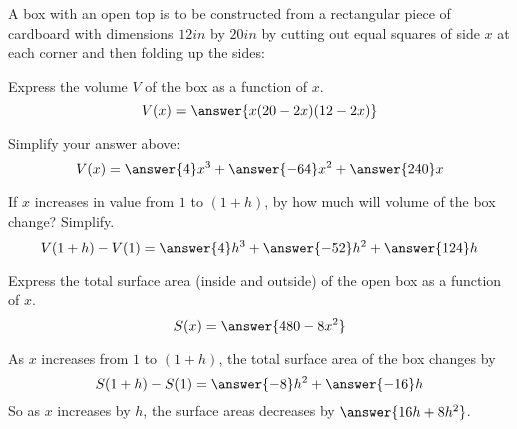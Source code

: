 \documentclass{ximera}
\author{Nela Lakos \and Bart Snapp}
\begin{document}
\begin{exercise}
  A box with an open top is to be constructed from a rectangular piece
  of cardboard with dimensions $12\unit{in}$ by $20\unit{in}$ by
  cutting out equal squares of side $x$ at each corner and then folding
  up the sides:
  \begin{image}
  \end{image}
  Express the volume $V$ of the box as a function of $x$.
  \[
  V(x) = \answer{x(20-2x)(12-2x)}
  \]
\end{exercise}
\begin{exercise}
  Simplify your answer above:
  \[
  V(x) = \answer{4}x^3 + \answer{-64}x^2 + \answer{240}x
  \]
\end{exercise}
\begin{exercise}
  If $x$ increases in value from $1$ to $(1+h)$, by how much will volume of the box change? Simplify.
  \[
  V(1+h) - V(1) = \answer{4}h^3 +\answer{-52}h^2 + \answer{124}h
  \]
\end{exercise}


\begin{exercise}
  Express the total surface area (inside and outside) of the open box
  as a function of $x$.
  \[
  S(x) = \answer{480-8x^2}
  \]
\end{exercise}
\begin{exercise}
  As $x$ increases from $1$ to $(1+h)$, the total surface area of the
  box changes by
  \[
  S(1+h) - S(1) = \answer{-8}h^2 + \answer{-16}h
  \]
  So as $x$ increases by $h$, the surface areas decreases by
  $\answer{16h+8h^2}$.

 \end{exercise}
\end{document}
